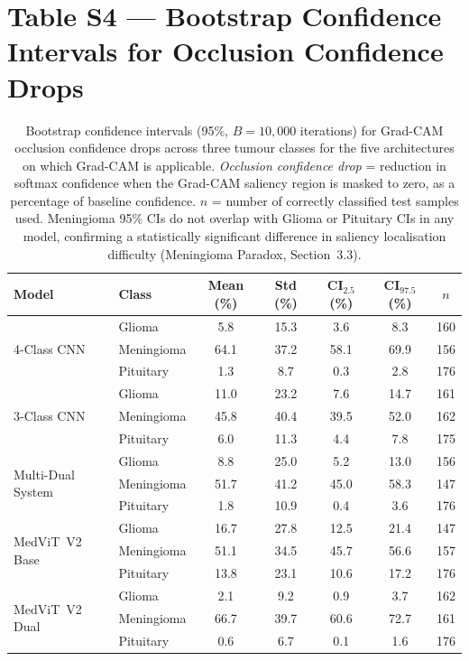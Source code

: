 \documentclass[12pt]{article}
\begin{document}
\newpage


\section*{Table S4 — Bootstrap Confidence Intervals for Occlusion Confidence Drops}

\begin{table}[ht]
\centering
\caption{Bootstrap confidence intervals (95\%, $B=10{,}000$ iterations) for
  Grad-CAM occlusion confidence drops across three tumour classes for the five
  architectures on which Grad-CAM is applicable.
  \emph{Occlusion confidence drop} = reduction in softmax confidence when the
  Grad-CAM saliency region is masked to zero, as a percentage of baseline
  confidence. $n$ = number of correctly classified test samples used.
  Meningioma 95\% CIs do not overlap with Glioma or Pituitary CIs in any
  model, confirming a statistically significant difference in saliency
  localisation difficulty (Meningioma Paradox, Section~3.3).}
\label{tab:s4_bootstrap}
\begin{tabular}{llccccc}
\toprule
\textbf{Model} & \textbf{Class} &
\textbf{Mean (\%)} & \textbf{Std (\%)} &
\textbf{CI$_{2.5}$ (\%)} & \textbf{CI$_{97.5}$ (\%)} &
$n$ \\
\midrule
\multirow{3}{*}{4-Class CNN}
  & Glioma      &  5.8 & 15.3 &  3.6 &  8.3 & 160 \\
  & Meningioma  & 64.1 & 37.2 & 58.1 & 69.9 & 156 \\
  & Pituitary   &  1.3 &  8.7 &  0.3 &  2.8 & 176 \\
\midrule
\multirow{3}{*}{3-Class CNN}
  & Glioma      & 11.0 & 23.2 &  7.6 & 14.7 & 161 \\
  & Meningioma  & 45.8 & 40.4 & 39.5 & 52.0 & 162 \\
  & Pituitary   &  6.0 & 11.3 &  4.4 &  7.8 & 175 \\
\midrule
\multirow{3}{*}{Multi-Dual System}
  & Glioma      &  8.8 & 25.0 &  5.2 & 13.0 & 156 \\
  & Meningioma  & 51.7 & 41.2 & 45.0 & 58.3 & 147 \\
  & Pituitary   &  1.8 & 10.9 &  0.4 &  3.6 & 176 \\
\midrule
\multirow{3}{*}{MedViT~V2 Base}
  & Glioma      & 16.7 & 27.8 & 12.5 & 21.4 & 147 \\
  & Meningioma  & 51.1 & 34.5 & 45.7 & 56.6 & 157 \\
  & Pituitary   & 13.8 & 23.1 & 10.6 & 17.2 & 176 \\
\midrule
\multirow{3}{*}{MedViT~V2 Dual}
  & Glioma      &  2.1 &  9.2 &  0.9 &  3.7 & 162 \\
  & Meningioma  & 66.7 & 39.7 & 60.6 & 72.7 & 161 \\
  & Pituitary   &  0.6 &  6.7 &  0.1 &  1.6 & 176 \\
\bottomrule
\end{tabular}
\end{table}
\end{document}
